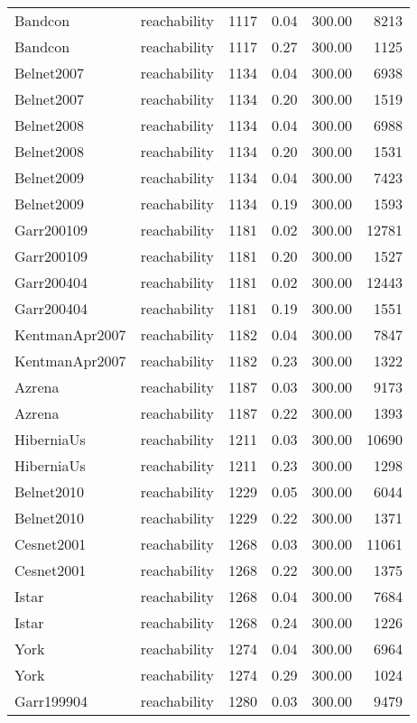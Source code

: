 \begin{tabular}{llrrrr}
Bandcon & reachability & 1117 & 0.04 & 300.00 & 8213 \\
Bandcon & reachability & 1117 & 0.27 & 300.00 & 1125 \\
Belnet2007 & reachability & 1134 & 0.04 & 300.00 & 6938 \\
Belnet2007 & reachability & 1134 & 0.20 & 300.00 & 1519 \\
Belnet2008 & reachability & 1134 & 0.04 & 300.00 & 6988 \\
Belnet2008 & reachability & 1134 & 0.20 & 300.00 & 1531 \\
Belnet2009 & reachability & 1134 & 0.04 & 300.00 & 7423 \\
Belnet2009 & reachability & 1134 & 0.19 & 300.00 & 1593 \\
Garr200109 & reachability & 1181 & 0.02 & 300.00 & 12781 \\
Garr200109 & reachability & 1181 & 0.20 & 300.00 & 1527 \\
Garr200404 & reachability & 1181 & 0.02 & 300.00 & 12443 \\
Garr200404 & reachability & 1181 & 0.19 & 300.00 & 1551 \\
KentmanApr2007 & reachability & 1182 & 0.04 & 300.00 & 7847 \\
KentmanApr2007 & reachability & 1182 & 0.23 & 300.00 & 1322 \\
Azrena & reachability & 1187 & 0.03 & 300.00 & 9173 \\
Azrena & reachability & 1187 & 0.22 & 300.00 & 1393 \\
HiberniaUs & reachability & 1211 & 0.03 & 300.00 & 10690 \\
HiberniaUs & reachability & 1211 & 0.23 & 300.00 & 1298 \\
Belnet2010 & reachability & 1229 & 0.05 & 300.00 & 6044 \\
Belnet2010 & reachability & 1229 & 0.22 & 300.00 & 1371 \\
Cesnet2001 & reachability & 1268 & 0.03 & 300.00 & 11061 \\
Cesnet2001 & reachability & 1268 & 0.22 & 300.00 & 1375 \\
Istar & reachability & 1268 & 0.04 & 300.00 & 7684 \\
Istar & reachability & 1268 & 0.24 & 300.00 & 1226 \\
York & reachability & 1274 & 0.04 & 300.00 & 6964 \\
York & reachability & 1274 & 0.29 & 300.00 & 1024 \\
Garr199904 & reachability & 1280 & 0.03 & 300.00 & 9479 \\

\end{tabular}
